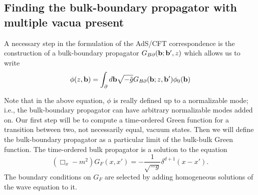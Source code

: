 \documentclass[a4paper,aps,prd,preprintnumbers,groupedaddress]{revtex4}
\begin{document}
\subsection{Finding the bulk-boundary propagator with multiple vacua present} \label{bulk-boundary}
A necessary step in the formulation of the AdS/CFT correspondence is the construction of a bulk-boundary propagator $G_{B\partial} ({\bf
b};{\bf b'},z)$ which allows us to write
\begin{equation} \label{bulk boundary gives phi}
\phi(z,{\bf b}) = \int _\partial d{\bf b} \sqrt{-\tilde{g}} G_{B\partial}({\bf b};z,{\bf b'}) \phi_0 ({\bf b})
\end{equation}

Note that in the above equation, $\phi$ is really defined up to a normalizable mode; i.e.,
the bulk-boundary propagator can have arbitrary normalizable modes added on.  Our first step will be to compute a time-ordered Green function for a transition between two, not necessarily equal, vacuum states. Then we will define the bulk-boundary propagator as a particular limit of the bulk-bulk Green function. The time-ordered bulk propagator is a solution to the
equation
\begin{equation} \label{feynman diffeq}
(\Box _x - m^2) G_F(x,x') = -\frac{1}{\sqrt{-g}} \delta^{d+1}(x-x') .
\end{equation}
The boundary conditions on $G_F$ are selected by adding homogeneous solutions of the wave equation to it.
\end{document}
